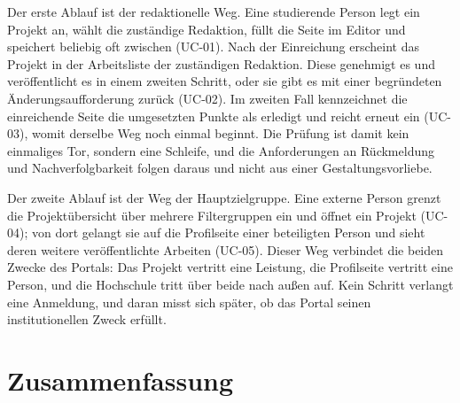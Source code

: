 Der erste Ablauf ist der redaktionelle Weg. Eine studierende Person legt ein Projekt an, wählt die zuständige Redaktion, füllt die Seite im Editor und speichert beliebig oft zwischen (UC-01). Nach der Einreichung erscheint das Projekt in der Arbeitsliste der zuständigen Redaktion. Diese genehmigt es und veröffentlicht es in einem zweiten Schritt, oder sie gibt es mit einer begründeten Änderungsaufforderung zurück (UC-02). Im zweiten Fall kennzeichnet die einreichende Seite die umgesetzten Punkte als erledigt und reicht erneut ein (UC-03), womit derselbe Weg noch einmal beginnt. Die Prüfung ist damit kein einmaliges Tor, sondern eine Schleife, und die Anforderungen an Rückmeldung und Nachverfolgbarkeit folgen daraus und nicht aus einer Gestaltungsvorliebe.

Der zweite Ablauf ist der Weg der Hauptzielgruppe. Eine externe Person grenzt die Projektübersicht über mehrere Filtergruppen ein und öffnet ein Projekt (UC-04); von dort gelangt sie auf die Profilseite einer beteiligten Person und sieht deren weitere veröffentlichte Arbeiten (UC-05). Dieser Weg verbindet die beiden Zwecke des Portals: Das Projekt vertritt eine Leistung, die Profilseite vertritt eine Person, und die Hochschule tritt über beide nach außen auf. Kein Schritt verlangt eine Anmeldung, und daran misst sich später, ob das Portal seinen institutionellen Zweck erfüllt.

\section{Zusammenfassung}
\label{sec:zusammenfassung-anforderungen}

